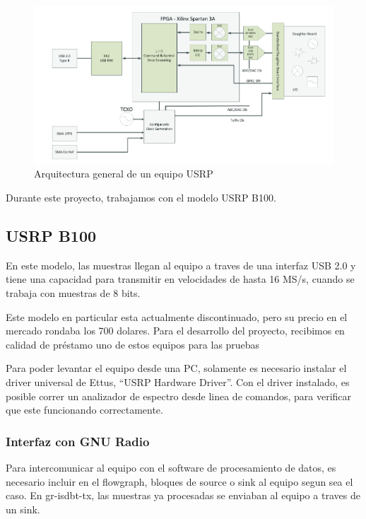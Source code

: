\begin{figure}[h!]
	\centering
	\includegraphics[scale=0.55]{figuras/cap04/usrp_arq}
	\caption{\label{f:usrp_arq} Arquitectura general de un equipo USRP}
\end{figure}

Durante este proyecto, trabajamos con el modelo USRP B100.

\subsection{USRP B100}

En este modelo, las muestras llegan al equipo a traves de una interfaz USB 2.0 y tiene una capacidad para transmitir en velocidades de hasta 16 MS/s, cuando se trabaja con muestras de 8 bits. 

Este modelo en particular esta actualmente discontinuado, pero su precio en el mercado rondaba los 700 dolares. Para el desarrollo del proyecto, recibimos en calidad de préstamo uno de estos equipos para las pruebas

Para poder levantar el equipo desde una PC, solamente es necesario instalar el driver universal de Ettus, “USRP Hardware Driver”. Con el driver instalado, es posible correr un analizador de espectro desde linea de comandos, para verificar que este funcionando correctamente.

\subsubsection{Interfaz con GNU Radio}

Para intercomunicar al equipo con el software de procesamiento de datos, es necesario incluir en el flowgraph, bloques de source o sink al equipo segun sea el caso. En gr-isdbt-tx, las muestras ya procesadas se enviaban al equipo a traves de un sink.  


